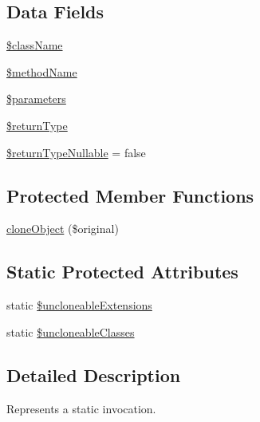 \subsection*{Data Fields}
\begin{DoxyCompactItemize}
\item 
\mbox{\hyperlink{class_p_h_p_unit___framework___mock_object___invocation___static_acd6a475a6eeb092f4eea3e19e502d67d}{\$class\+Name}}
\item 
\mbox{\hyperlink{class_p_h_p_unit___framework___mock_object___invocation___static_ad479eda0c46ab0a05479aadca5fb99b2}{\$method\+Name}}
\item 
\mbox{\hyperlink{class_p_h_p_unit___framework___mock_object___invocation___static_ab79d246480c4ac3a0db6bbceca92ad32}{\$parameters}}
\item 
\mbox{\hyperlink{class_p_h_p_unit___framework___mock_object___invocation___static_a0f317c2c1d4c617554890223a39037be}{\$return\+Type}}
\item 
\mbox{\hyperlink{class_p_h_p_unit___framework___mock_object___invocation___static_a1ea2e46e43328dc59bb66a6d1d1b55df}{\$return\+Type\+Nullable}} = false
\end{DoxyCompactItemize}
\subsection*{Protected Member Functions}
\begin{DoxyCompactItemize}
\item 
\mbox{\hyperlink{class_p_h_p_unit___framework___mock_object___invocation___static_ac72b8727963c458ed288633ba9fde35f}{clone\+Object}} (\$original)
\end{DoxyCompactItemize}
\subsection*{Static Protected Attributes}
\begin{DoxyCompactItemize}
\item 
static \mbox{\hyperlink{class_p_h_p_unit___framework___mock_object___invocation___static_a6668c78a16f2ad52a9cab8d84be206a8}{\$uncloneable\+Extensions}}
\item 
static \mbox{\hyperlink{class_p_h_p_unit___framework___mock_object___invocation___static_a364ec0dff1291e706cb7642b2f19bda0}{\$uncloneable\+Classes}}
\end{DoxyCompactItemize}


\subsection{Detailed Description}
Represents a static invocation.

